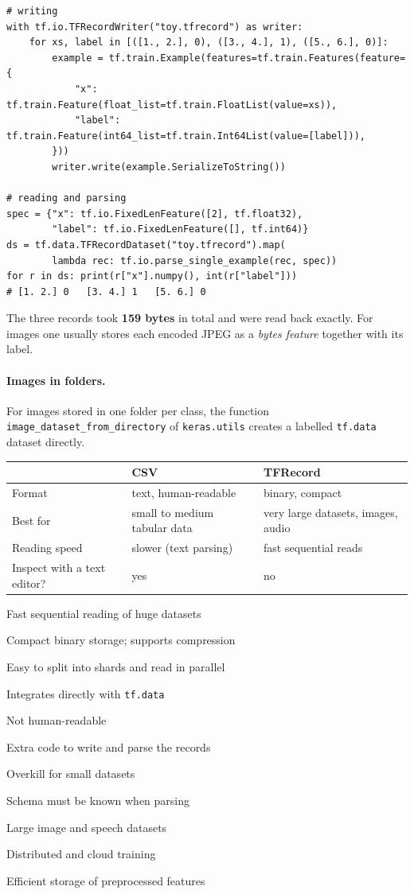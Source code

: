 \begin{lstlisting}
# writing
with tf.io.TFRecordWriter("toy.tfrecord") as writer:
    for xs, label in [([1., 2.], 0), ([3., 4.], 1), ([5., 6.], 0)]:
        example = tf.train.Example(features=tf.train.Features(feature={
            "x":     tf.train.Feature(float_list=tf.train.FloatList(value=xs)),
            "label": tf.train.Feature(int64_list=tf.train.Int64List(value=[label])),
        }))
        writer.write(example.SerializeToString())

# reading and parsing
spec = {"x": tf.io.FixedLenFeature([2], tf.float32),
        "label": tf.io.FixedLenFeature([], tf.int64)}
ds = tf.data.TFRecordDataset("toy.tfrecord").map(
        lambda rec: tf.io.parse_single_example(rec, spec))
for r in ds: print(r["x"].numpy(), int(r["label"]))
# [1. 2.] 0   [3. 4.] 1   [5. 6.] 0
\end{lstlisting}

The three records took \textbf{159 bytes} in total and were read back exactly. For images one usually stores each encoded JPEG as a \emph{bytes feature} together with its label.

\paragraph{Images in folders.} For images stored in one folder per class, the function \texttt{image\_dataset\_\allowbreak from\_directory} of \texttt{keras.utils} creates a labelled \texttt{tf.data} dataset directly.

\begin{center}
\begin{tabular}{@{}p{3cm}p{5.1cm}p{5.1cm}@{}}
\toprule
 & \textbf{CSV} & \textbf{TFRecord}\\
\midrule
Format & text, human-readable & binary, compact\\
Best for & small to medium tabular data & very large datasets, images, audio\\
Reading speed & slower (text parsing) & fast sequential reads\\
Inspect with a text editor? & yes & no\\
\bottomrule
\end{tabular}
\end{center}

{\item Fast sequential reading of huge datasets
 \item Compact binary storage; supports compression
 \item Easy to split into shards and read in parallel
 \item Integrates directly with \texttt{tf.data}}
{\item Not human-readable
 \item Extra code to write and parse the records
 \item Overkill for small datasets
 \item Schema must be known when parsing}
{\item Large image and speech datasets
 \item Distributed and cloud training
 \item Efficient storage of preprocessed features}

